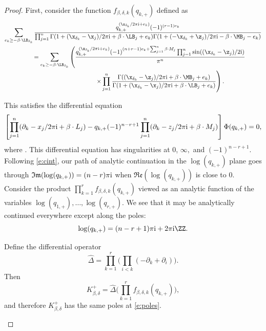 \begin{proof}


First, consider the function $f_{\beta, \delta, k}(q_{k, +})$ defined as
\begin{gather*}
\sum_{e_k \geq - \beta \cdot \LB_{\delta_k}}
\frac{q_{k, +}^{( \x_{\delta_k}/2\pi {\rm i} + e_k)} (-1)^{(r-1)e_k}}{
\prod_{j=1}^n\Gamma(1+(\x_{\delta_k}-\x_j)/2 \pi {\rm i}+\beta\cdot \LB_j+e_k)\Gamma(1+(-\x_{\delta_k}+\z_j)/2 \pi {\rm i}-\beta\cdot \MB_j-e_k)} \\
\qquad{}=\sum_{e_k \geq - \beta \cdot \LB_{\delta_k}}
\left( \frac{q_{k, +}^{( \x_{\delta_k}/2\pi {\rm i} + e_k)}(-1)^{(n+r-1)e_k + \sum_{j=1}^n \beta \cdot M_j }\prod_{j=1}^n \sin((\x_{\delta_k}-\z_j)/2{\rm i})
 }{ \pi^n
} \right. \\
\qquad\quad\hphantom{=\sum_{e_k \geq - \beta \cdot \LB_{\delta_k}}}{} \left.\times \prod_{j=1}^n\frac{\Gamma((\x_{\delta_k}-\z_j)/2 \pi {\rm i}+\beta\cdot \MB_j+e_k)}{\Gamma(1+(\x_{\delta_k}-\x_j)/2 \pi {\rm i}+\beta\cdot \LB_j+e_k)}\right).
\end{gather*}

This satisfies the differential equation
\[
\left[\prod_{j=1}^n (\partial_k -x_j/2 \pi {\rm i} + \beta \cdot L_j) - q_{k, +}(-1)^{n-r+1}\prod_{j=1}^n (\partial_k -z_j/2 \pi {\rm i} + \beta \cdot M_j) \right] \Phi(q_{k,+}) = 0,
\]
where . This differential equation has singularities at $0$, $\infty,$ and $(-1)^{n-r+1}$. Follo\-wing \eqref{e:cint}, our path of analytic continuation in the $\log(q_{k,+})$ plane goes through $\mathfrak{Im}(\log(q_{k,+})) = (n-r)\pi {\rm i}$ when $\mathfrak{Re}(\log(q_{k,+}))$ is close to 0.
Consider the product
$
\prod_{k=1}^r   f_{\beta, \delta, k}(q_{k, +})$
viewed as an analytic function of the variables $\log(q_{1, +}),\allowbreak \dots, \log(q_{r, +})$. We see that it may be analytically continued everywhere except along the poles:
\begin{equation} \label{e:poles} \log(q_{k,+}) = (n-r+1)\pi {\rm i} + 2 \pi {\rm i} \ZZ.\end{equation}

Define the differential operator
\[
\hat \Delta = \prod_{k=1}^r \biggl( \prod_{i< k} (-\partial_k + \partial_i) \biggr).
\]
Then
\[
K^+_{\beta, \delta} = \hat \Delta \Biggl( \prod_{k=1}^r f_{\beta, \delta, k}(q_{k, +}) \Biggr),
\]
and therefore $ K^+_{\beta, \delta}$ has the same poles at \eqref{e:poles}.


 \begin{figure}[t]\centering
{} %


\end{figure}
\end{proof}
